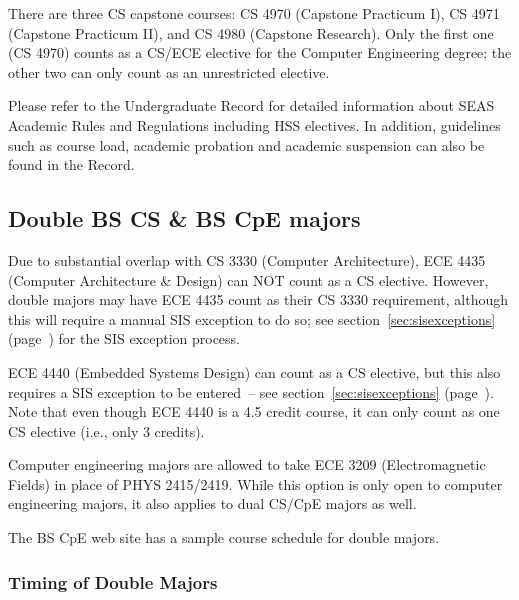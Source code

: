 
There are three CS capstone courses: CS 4970 (Capstone Practicum I), 
CS 4971 (Capstone Practicum II), and CS 4980 (Capstone Research).
Only the first one (CS 4970) counts as a CS/ECE elective for the
Computer Engineering degree; the other two can only count as an
unrestricted elective.

Please refer to the Undergraduate
Record for detailed
information about SEAS Academic Rules and Regulations including HSS
electives. In addition, guidelines such as course load, academic
probation and academic suspension can also be found in the Record.


\subsection{Double BS CS \& BS CpE majors}
\label{bscscpedoublemajors}

Due to substantial overlap with CS 3330 (Computer Architecture), ECE
4435 (Computer Architecture \& Design) can NOT count as a CS elective.
However, double majors may have ECE 4435 count as their CS 3330
requirement, although this will require a manual SIS exception to do
so; see section~\ref{sec:sisexceptions}
(page~\pageref{sec:sisexceptions}) for the SIS exception process.

ECE 4440 (Embedded Systems Design) can count as a CS elective, but
this also requires a SIS exception to be entered~-- see
section~\ref{sec:sisexceptions} (page~\pageref{sec:sisexceptions}).
Note that even though ECE 4440 is a 4.5 credit course, it can only
count as one CS elective (i.e., only 3 credits).

Computer engineering majors are allowed to take ECE 3209
(Electromagnetic Fields) in place of PHYS 2415/2419.  While this
option is only open to computer engineering majors, it also applies to
dual CS/CpE majors as well.

The BS CpE web site has a
sample course schedule for double majors.

\subsubsection{Timing of Double Majors}

